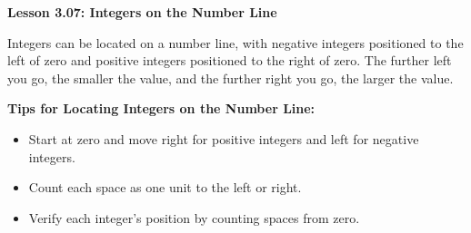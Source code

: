 \begin{center}
\textbf{Lesson 3.07: Integers on the Number Line}
\end{center}

\vspace*{-1.5ex}


\noindent Integers can be located on a number line, with negative integers positioned to the left of zero and positive integers positioned to the right of zero. The further left you go, the smaller the value, and the further right you go, the larger the value.

\noindent\textbf{Tips for Locating Integers on the Number Line:}
\begin{itemize}
    \item Start at zero and move right for positive integers and left for negative integers.
    \item Count each space as one unit to the left or right.
    \item Verify each integer’s position by counting spaces from zero.
\end{itemize}






